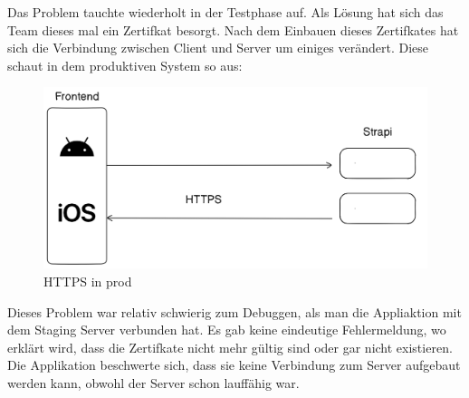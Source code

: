 Das Problem tauchte wiederholt in der Testphase auf. Als Lösung hat sich das Team dieses mal ein Zertifkat besorgt. Nach dem Einbauen dieses Zertifkates hat sich die Verbindung zwischen Client und Server um einiges verändert. Diese schaut in dem produktiven System so aus:
\begin{figure}[H]
    \centering
    \includegraphics*[width=\textwidth]{./pics/https.png}
    \caption{HTTPS in prod}
\end{figure}

Dieses Problem war relativ schwierig zum Debuggen,
als man die Appliaktion mit dem Staging Server verbunden hat.
Es gab keine eindeutige Fehlermeldung, wo erklärt wird, dass die Zertifkate nicht mehr gültig sind oder gar nicht existieren.
Die Applikation beschwerte sich, dass sie keine Verbindung zum Server aufgebaut werden kann, obwohl der Server schon lauffähig war.





